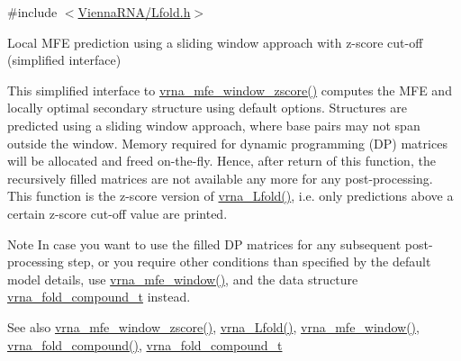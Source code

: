 {\ttfamily \#include $<$\mbox{\hyperlink{_lfold_8h}{Vienna\+R\+N\+A/\+Lfold.\+h}}$>$}



Local M\+FE prediction using a sliding window approach with z-\/score cut-\/off (simplified interface) 

This simplified interface to \mbox{\hyperlink{group__local__mfe__fold_gaa4f67ae94efd08d800c17f9b53423fd6}{vrna\+\_\+mfe\+\_\+window\+\_\+zscore()}} computes the M\+FE and locally optimal secondary structure using default options. Structures are predicted using a sliding window approach, where base pairs may not span outside the window. Memory required for dynamic programming (DP) matrices will be allocated and free\textquotesingle{}d on-\/the-\/fly. Hence, after return of this function, the recursively filled matrices are not available any more for any post-\/processing. This function is the z-\/score version of \mbox{\hyperlink{group__local__mfe__fold_ga4918cce52bf69c1913cda503b2ac75d8}{vrna\+\_\+\+Lfold()}}, i.\+e. only predictions above a certain z-\/score cut-\/off value are printed.

\begin{DoxyNote}{Note}
In case you want to use the filled DP matrices for any subsequent post-\/processing step, or you require other conditions than specified by the default model details, use \mbox{\hyperlink{group__local__mfe__fold_ga689df235a1915a1ad56e377383c044ce}{vrna\+\_\+mfe\+\_\+window()}}, and the data structure \mbox{\hyperlink{group__fold__compound_ga1b0cef17fd40466cef5968eaeeff6166}{vrna\+\_\+fold\+\_\+compound\+\_\+t}} instead.
\end{DoxyNote}
\begin{DoxySeeAlso}{See also}
\mbox{\hyperlink{group__local__mfe__fold_gaa4f67ae94efd08d800c17f9b53423fd6}{vrna\+\_\+mfe\+\_\+window\+\_\+zscore()}}, \mbox{\hyperlink{group__local__mfe__fold_ga4918cce52bf69c1913cda503b2ac75d8}{vrna\+\_\+\+Lfold()}}, \mbox{\hyperlink{group__local__mfe__fold_ga689df235a1915a1ad56e377383c044ce}{vrna\+\_\+mfe\+\_\+window()}}, \mbox{\hyperlink{group__fold__compound_ga6601d994ba32b11511b36f68b08403be}{vrna\+\_\+fold\+\_\+compound()}}, \mbox{\hyperlink{group__fold__compound_ga1b0cef17fd40466cef5968eaeeff6166}{vrna\+\_\+fold\+\_\+compound\+\_\+t}}
\end{DoxySeeAlso}

